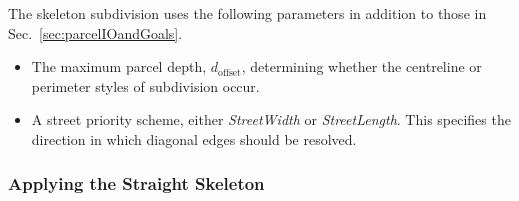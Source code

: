 The skeleton subdivision uses the following parameters in addition to those in Sec.~\ref{sec:parcelIOandGoals}.
\begin{itemize}
\item The maximum parcel depth, $d_{\text{offset}}$, determining whether the centreline or perimeter styles of subdivision occur. 
\item A street priority scheme, either \emph{StreetWidth} or \emph{StreetLength}. This specifies the direction in which diagonal edges should be resolved.
\end{itemize}







\subsubsection{Applying the Straight Skeleton}
\label{sec:skeletonInitial}

